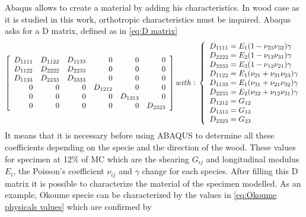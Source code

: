 Abaqus allows to create a material by adding his characteristics. In wood case as it is studied in this work, orthotropic characteristics must be inquired. Abaqus asks for a D matrix, defined as in \ref{eq:D matrix}
\begin{equation}
	\left[
	\begin{array}{rrrrrr}
		D_{1111} & D_{1122} & D_{1133} &
		0 & 0 & 0 \\
		D_{1122} &
		D_{2222} &
		D_{2233} &
		0 & 0 & 0 \\
		D_{1133} &
		D_{2233} &
		D_{3333} &
		0 & 0 & 0 \\
		0 & 0 & 0 &
		D_{1212} & 0 & 0 \\
		0 & 0 & 0 & 0 &
		D_{1313} & 0 \\
		0 & 0 & 0 & 0 & 0 &
		D_{2323} \\
	\end{array}
	\right]
	with : \\
	\\
	\left\{
	\begin{array}{lllll}
		D_{1111}=E_{1}(1-\nu_{23}\nu_{32})\gamma \\
		D_{2222}=E_{2}(1-\nu_{13}\nu_{31})\gamma \\
		D_{3333}=E_{3}(1-\nu_{12}\nu_{21})\gamma \\
		D_{1122}=E_{1}(\nu_{21}+\nu_{31}\nu_{23})\gamma \\	D_{1133}=E_{1}(\nu_{31}+\nu_{21}\nu_{32})\gamma	 \\	D_{2233}=E_{2}(\nu_{32}+\nu_{12}\nu_{31})\gamma \\	D_{1212}=G_{12} \\	D_{1313}=G_{13} \\	D_{2323}=G_{23} \\
	\end{array}
	\right.
	\label{eq:D matrix}
\end{equation}
It means that it is necessary before using ABAQUS to determine all these coefficients depending on the specie and the direction of the wood. These values for specimen at 12\% of MC which are the shearing $G_{ij}$ and longitudinal modulus $E_{i}$, the Poisson's coefficient $\nu_{ij}$ and $\gamma$ change for each species. After filling this D matrix it is possible to characterize the material of the specimen modelled. As an example, Okoume specie can be characterized by the values in \ref{eq:Okoume physicals values} which are confirmed by \parencite{Reference5}
